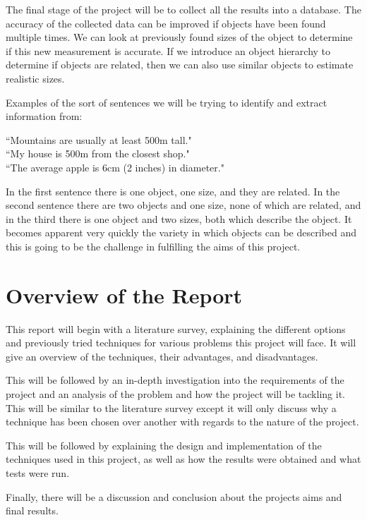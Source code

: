 \documentclass[11pt,oneside]{book}
\begin{document}
The final stage of the project will be to collect all the results into a database. The accuracy of the collected data can be improved if objects have been found multiple times. We can look at previously found sizes of the object to determine if this new measurement is accurate. If we introduce an object hierarchy to determine if objects are related, then we can also use similar objects to estimate realistic sizes.

Examples of the sort of sentences we will be trying to identify and extract information from:
\begin{displayquote}
“Mountains are usually at least 500m tall."
\\“My house is 500m from the closest shop."
\\“The average apple is 6cm (2 inches) in diameter."
\end{displayquote}

\noindent In the first sentence there is one object, one size, and they are related. In the second sentence there are two objects and one size, none of which are related, and in the third there is one object and two sizes, both which describe the object. It becomes apparent very quickly the variety in which objects can be described and this is going to be the challenge in fulfilling the aims of this project.

\section{Overview of the Report}

This report will begin with a literature survey, explaining the different options and previously tried techniques for various problems this project will face. It will give an overview of the techniques, their advantages, and disadvantages.

This will be followed by an in-depth investigation into the requirements of the project and an analysis of the problem and how the project will be tackling it. This will be similar to the literature survey except it will only discuss why a technique has been chosen over another with regards to the nature of the project.

This will be followed by explaining the design and implementation of the techniques used in this project, as well as how the results were obtained and what tests were run.

Finally, there will be a discussion and conclusion about the projects aims and final results.
\end{document}

